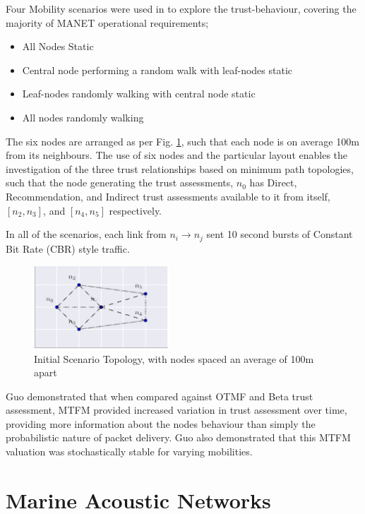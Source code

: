 \documentclass[runningheads,a4paper]{llncs}
\begin{document}
Four Mobility scenarios were used in \cite{Guo11} to explore the trust-behaviour, covering the majority of MANET operational requirements; 

\begin{itemize}
  \item All Nodes Static
  \item Central node performing a random walk with leaf-nodes static
  \item Leaf-nodes randomly walking with central node static
  \item All nodes randomly walking
\end{itemize}

The six nodes are arranged as per Fig. \ref{fig:s1_layout}, such that each node is on average 100m from its neighbours. 
The use of six nodes and the particular layout enables the investigation of the three trust relationships based on minimum path topologies, such that the node generating the trust assessments, $n_0$ has Direct, Recommendation, and Indirect trust assessments available to it from itself, $[n_2,n_3]$, and $[n_4,n_5]$ respectively.

In all of the scenarios, each link from $n_i \rightarrow n_j$ sent 10 second bursts of Constant Bit Rate (CBR) style traffic.

\begin{figure}[h]
  \centering
  \includegraphics[width=0.45\textwidth]{img/s1_layout.pdf}
  \caption{Initial Scenario Topology, with nodes spaced an average of 100m apart}
  \label{fig:s1_layout}
\end{figure}

Guo demonstrated that when compared against OTMF and Beta trust assessment, MTFM provided increased variation in trust assessment over time, providing more information about the nodes behaviour than simply the probabilistic nature of packet delivery. Guo also demonstrated that this MTFM valuation was stochastically stable for varying mobilities. 


\section{Marine Acoustic Networks}\label{sec:marineacousticnetworks}
\end{document}

